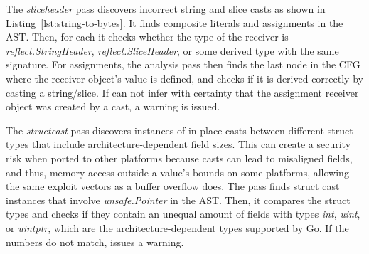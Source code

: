 The \textit{sliceheader} pass discovers incorrect string and slice casts as shown in Listing~\ref{lst:string-to-bytes}.
It finds composite literals and assignments in the AST.
Then, for each it checks whether the type of the %
receiver is \textit{reflect.StringHeader}, \textit{reflect.SliceHeader}, or some derived type with the same signature.
For assignments, the analysis pass then finds the last node in the CFG where the receiver object's value is defined, and checks if it is derived correctly by casting a string/slice.
If \toolSA{} can not infer with certainty that the assignment receiver object was created by a cast, a warning is issued.

The \textit{structcast} pass discovers instances of in-place casts between different struct types that include architecture-dependent field sizes. 
This can create a security risk when ported to other platforms because \unsafe{} casts can lead to misaligned fields, and thus, memory access outside a value's bounds on some platforms, allowing the same exploit vectors as a buffer overflow does.
The pass finds struct cast instances that involve \textit{unsafe.Pointer} in the AST.
Then, it compares the struct types and checks if they contain an unequal amount of fields with types \textit{int}, \textit{uint}, or \textit{uintptr}, which are the architecture-dependent types supported by Go.
If the numbers do not match, \toolSA{} issues a warning.

